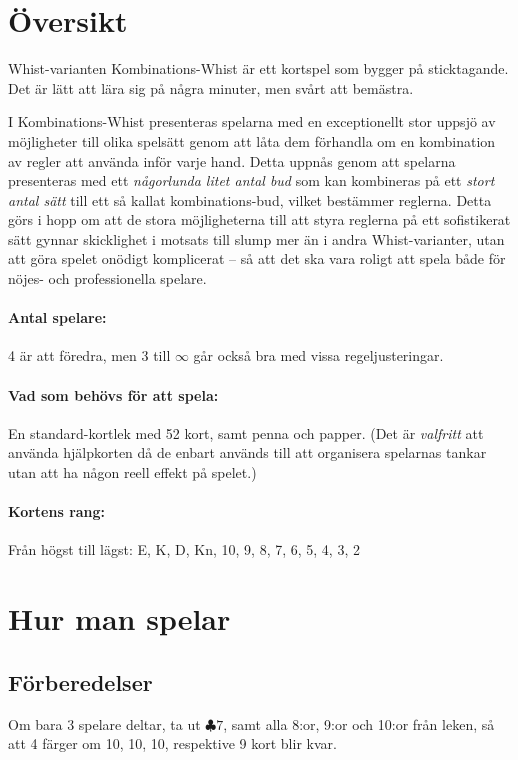 \documentclass[a4paper]{article} %
\author{Av Joakim Nilsson}
\date{Utvecklingsversion (baserad på version \varVersion-\varLanguage) -- \today}
\date{Version \varVersion-\varLanguage\ -- \today}
\begin{document}

	\introPages
	\pagebreak


	\section{Översikt}
	Whist-varianten Kombinations-Whist är ett kortspel som bygger på sticktagande. Det är lätt att lära sig på några minuter, men svårt att bemästra.

	I Kombinations-Whist presenteras spelarna med en exceptionellt stor uppsjö av möjligheter till olika spelsätt genom att låta dem förhandla om en kombination av regler att använda inför varje hand. Detta uppnås genom att spelarna presenteras med ett \emph{någorlunda litet antal bud} som kan kombineras på ett \emph{stort antal sätt} till ett så kallat kombinations-bud, vilket bestämmer reglerna. Detta görs i hopp om att de stora möjligheterna till att styra reglerna på ett sofistikerat sätt gynnar skicklighet i motsats till slump mer än i andra Whist-varianter, utan att göra spelet onödigt komplicerat -- så att det ska vara roligt att spela både för nöjes- och professionella spelare.

	\paragraph{Antal spelare:}
	4 är att föredra, men 3 till $\infty$ går också bra med vissa regeljusteringar.

	\paragraph{Vad som behövs för att spela:}
	En standard-kortlek med 52 kort, samt penna och papper. (Det är \emph{valfritt} att använda hjälpkorten då de enbart används till att organisera spelarnas tankar utan att ha någon reell effekt på spelet.)

	\paragraph{Kortens rang:}
	Från högst till lägst: E, K, D, Kn, 10, 9, 8, 7, 6, 5, 4, 3, 2

	\section{Hur man spelar}
	\subsection{Förberedelser}
	Om bara 3 spelare deltar, ta ut $\clubsuit 7$, samt alla 8:or, 9:or och 10:or från leken, så att 4 färger om 10, 10, 10, respektive 9 kort blir kvar.
\end{document}
